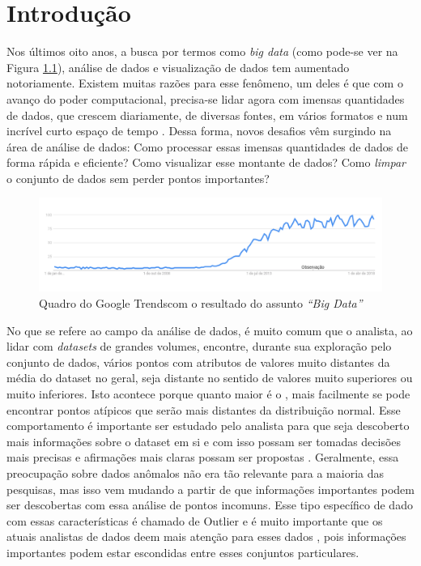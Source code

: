 \chapter{Introdução}
\label{chap:introducao}

Nos últimos oito anos, a busca por termos como \textit{big data} (como pode-se ver na Figura \ref{fig:google-trend}), análise de dados e visualização de dados tem aumentado notoriamente. Existem muitas razões para esse fenômeno, um deles é que com o avanço do poder computacional, precisa-se lidar agora com imensas quantidades de dados, que crescem diariamente, de diversas fontes, em vários formatos e num incrível curto espaço de tempo \cite{BigDataAnalyticsPaper}. Dessa forma, novos desafios vêm surgindo na área de análise de dados: Como processar essas imensas quantidades de dados de forma rápida e eficiente? Como visualizar esse montante de dados? Como \textit{limpar} o conjunto de dados sem perder pontos importantes?

\begin{figure}[!h]
	\centering
	\includegraphics[width=\textwidth]{images/google-trend-big-data.png}
	\caption[Quadro do Google Trends com o resultado do assunto \textit{``Big Data''}]{Quadro do Google Trends\footnotemark \text{ }com o resultado do assunto \textit{``Big Data''}}
	\label{fig:google-trend}
	\vspace{-10pt}
\end{figure}


No que se refere ao campo da análise de dados, é muito comum que o analista, ao lidar com \textit{datasets} de grandes volumes, encontre, durante sua exploração pelo conjunto de dados, vários pontos com atributos de valores muito distantes da média do dataset no geral, seja distante no sentido de valores muito superiores ou muito inferiores. Isto acontece porque quanto maior é o , mais facilmente se pode encontrar pontos atípicos que serão mais distantes da distribuição normal. Esse comportamento é importante ser estudado pelo analista para que seja descoberto mais informações sobre o dataset em si e com isso possam ser tomadas decisões mais precisas e afirmações mais claras possam ser propostas \cite{DBLP:journals/debu/FreireCVZ16}. Geralmente, essa preocupação sobre dados anômalos não era tão relevante para a maioria das pesquisas, mas isso vem mudando a partir de que informações importantes podem ser descobertas com essa análise de pontos incomuns. Esse tipo específico de dado com essas características é chamado de Outlier e é muito importante que os atuais analistas de dados deem mais atenção para esses dados \cite{J.Xi:2008}, pois informações importantes podem estar escondidas entre esses conjuntos particulares.

